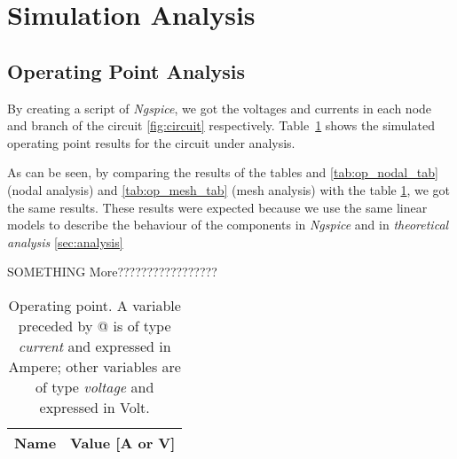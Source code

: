 \section{Simulation Analysis}
\label{sec:simulation}

\subsection{Operating Point Analysis}

By creating a script of \textit{Ngspice}, we got the voltages and currents in each node and branch of
the circuit \ref{fig:circuit} respectively. Table~\ref{tab:op_tab} shows the simulated operating point results for the circuit
under analysis.
\hfill

As can be seen, by comparing the results of the tables and \ref{tab:op_nodal_tab} (nodal analysis) and \ref{tab:op_mesh_tab} (mesh analysis)
with the table \ref{tab:op_tab}, we got the same results.
These results were expected because we use the same linear models to describe the behaviour of the components in \textit{Ngspice} and in \textit{theoretical analysis} \ref{sec:analysis}


SOMETHING More?????????????????


\begin{table}[ht]
  \centering
  \begin{tabular}{|l|r|}
    \hline
    {\bf Name} & {\bf Value [A or V]} \\ \hline
    
  \end{tabular}
  \caption{Operating point. A variable preceded by @ is of type {\em current}
    and expressed in Ampere; other variables are of type {\it voltage} and expressed in
    Volt.}
  \label{tab:op_tab}
\end{table}






